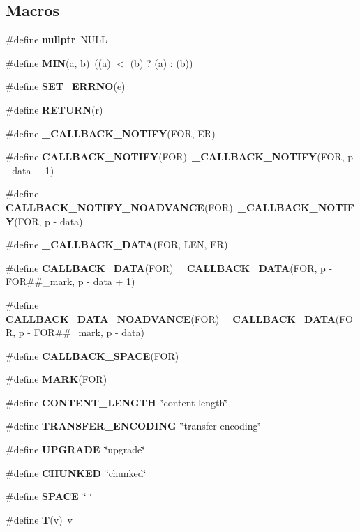 \subsection*{Macros}
\begin{DoxyCompactItemize}
\item 
\#define {\bf nullptr}~N\+U\+LL
\item 
\#define {\bf M\+IN}(a,  b)~((a) $<$ (b) ? (a) \+: (b))
\item 
\#define {\bf S\+E\+T\+\_\+\+E\+R\+R\+NO}(e)
\item 
\#define {\bf R\+E\+T\+U\+RN}(r)
\item 
\#define {\bf \+\_\+\+C\+A\+L\+L\+B\+A\+C\+K\+\_\+\+N\+O\+T\+I\+FY}(F\+OR,  ER)
\item 
\#define {\bf C\+A\+L\+L\+B\+A\+C\+K\+\_\+\+N\+O\+T\+I\+FY}(F\+OR)~{\bf \+\_\+\+C\+A\+L\+L\+B\+A\+C\+K\+\_\+\+N\+O\+T\+I\+FY}(F\+OR, p -\/ data + 1)
\item 
\#define {\bf C\+A\+L\+L\+B\+A\+C\+K\+\_\+\+N\+O\+T\+I\+F\+Y\+\_\+\+N\+O\+A\+D\+V\+A\+N\+CE}(F\+OR)~{\bf \+\_\+\+C\+A\+L\+L\+B\+A\+C\+K\+\_\+\+N\+O\+T\+I\+FY}(F\+OR, p -\/ data)
\item 
\#define {\bf \+\_\+\+C\+A\+L\+L\+B\+A\+C\+K\+\_\+\+D\+A\+TA}(F\+OR,  L\+EN,  ER)
\item 
\#define {\bf C\+A\+L\+L\+B\+A\+C\+K\+\_\+\+D\+A\+TA}(F\+OR)~{\bf \+\_\+\+C\+A\+L\+L\+B\+A\+C\+K\+\_\+\+D\+A\+TA}(F\+OR, p -\/ F\+OR\#\#\+\_\+mark, p -\/ data + 1)
\item 
\#define {\bf C\+A\+L\+L\+B\+A\+C\+K\+\_\+\+D\+A\+T\+A\+\_\+\+N\+O\+A\+D\+V\+A\+N\+CE}(F\+OR)~{\bf \+\_\+\+C\+A\+L\+L\+B\+A\+C\+K\+\_\+\+D\+A\+TA}(F\+OR, p -\/ F\+OR\#\#\+\_\+mark, p -\/ data)
\item 
\#define {\bf C\+A\+L\+L\+B\+A\+C\+K\+\_\+\+S\+P\+A\+CE}(F\+OR)
\item 
\#define {\bf M\+A\+RK}(F\+OR)
\item 
\#define {\bf C\+O\+N\+T\+E\+N\+T\+\_\+\+L\+E\+N\+G\+TH}~\char`\"{}content-\/length\char`\"{}
\item 
\#define {\bf T\+R\+A\+N\+S\+F\+E\+R\+\_\+\+E\+N\+C\+O\+D\+I\+NG}~\char`\"{}transfer-\/encoding\char`\"{}
\item 
\#define {\bf U\+P\+G\+R\+A\+DE}~\char`\"{}upgrade\char`\"{}
\item 
\#define {\bf C\+H\+U\+N\+K\+ED}~\char`\"{}chunked\char`\"{}
\item 
\#define {\bf S\+P\+A\+CE}~\char`\"{} \char`\"{}
\item 
\#define {\bf T}(v)~v
\item 

\end{DoxyCompactItemize}
